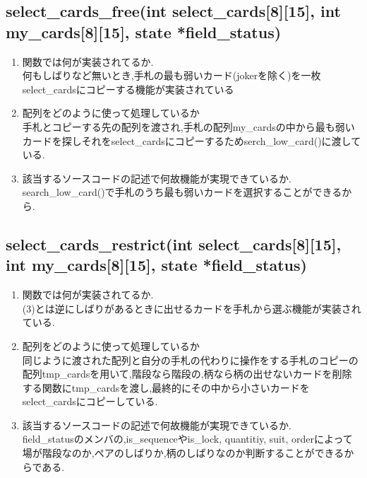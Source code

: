 \documentclass{jsarticle}
\begin{document}
\subsection{select\_cards\_free(int select\_cards[8][15], int my\_cards[8][15], state *field\_status)}

\begin{enumerate}
  \item  関数では何が実装されてるか.\\
  何もしばりなど無いとき,手札の最も弱いカード(jokerを除く)を一枚select\_cardsにコピーする機能が実装されている
  \item 配列をどのように使って処理しているか\\
  手札とコピーする先の配列を渡され,手札の配列my\_cardsの中から最も弱いカードを探しそれをselect\_cardsにコピーするためserch\_low\_card()に渡している.
  \item 該当するソースコードの記述で何故機能が実現できているか.\\
  search\_low\_card()で手札のうち最も弱いカードを選択することができるから.
\end{enumerate}

\subsection{select\_cards\_restrict(int select\_cards[8][15], int my\_cards[8][15], state *field\_status)}

\begin{enumerate}
  \item 関数では何が実装されてるか.\\
  (3)とは逆にしばりがあるときに出せるカードを手札から選ぶ機能が実装されている.
  \item 配列をどのように使って処理しているか\\
  同じように渡された配列と自分の手札の代わりに操作をする手札のコピーの配列tmp\_cardsを用いて,階段なら階段の,柄なら柄の出せないカードを削除する関数にtmp\_cardsを渡し,最終的にその中から小さいカードをselect\_cardsにコピーしている.
  \item 該当するソースコードの記述で何故機能が実現できているか.\\
  field\_statusのメンバの,is\_sequenceやis\_lock, quantitiy, suit, orderによって場が階段なのか,ペアのしばりか,柄のしばりなのか判断することができるからである.
\end{enumerate}
\end{document}
